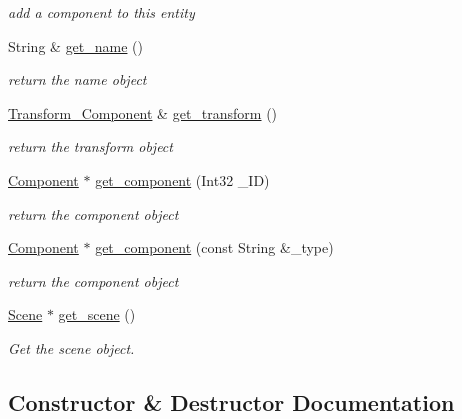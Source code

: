 \begin{DoxyCompactItemize}
\begin{DoxyCompactList}\small\item\em add a component to this entity \end{DoxyCompactList}\item 
String \& \mbox{\hyperlink{classbanita_1_1_entity_aa270c75c0dead62a45a39e4b2b016988}{get\+\_\+name}} ()
\begin{DoxyCompactList}\small\item\em return the name object \end{DoxyCompactList}\item 
\mbox{\hyperlink{classbanita_1_1_transform___component}{Transform\+\_\+\+Component}} \& \mbox{\hyperlink{classbanita_1_1_entity_af19f6e2e27d0f519032da54ef7dec759}{get\+\_\+transform}} ()
\begin{DoxyCompactList}\small\item\em return the transform object \end{DoxyCompactList}\item 
\mbox{\hyperlink{classbanita_1_1_component}{Component}} $\ast$ \mbox{\hyperlink{classbanita_1_1_entity_a6e24a4ca55bf664035d39ab229f849c1}{get\+\_\+component}} (Int32 \+\_\+\+ID)
\begin{DoxyCompactList}\small\item\em return the component object \end{DoxyCompactList}\item 
\mbox{\hyperlink{classbanita_1_1_component}{Component}} $\ast$ \mbox{\hyperlink{classbanita_1_1_entity_aa8fbd735440d40b2a934828aa5e726d6}{get\+\_\+component}} (const String \&\+\_\+type)
\begin{DoxyCompactList}\small\item\em return the component object \end{DoxyCompactList}\item 
\mbox{\hyperlink{classbanita_1_1_scene}{Scene}} $\ast$ \mbox{\hyperlink{classbanita_1_1_entity_abc8ae6f7a0de629ae3a35d904c4338de}{get\+\_\+scene}} ()
\begin{DoxyCompactList}\small\item\em Get the scene object. \end{DoxyCompactList}\end{DoxyCompactItemize}


\subsection{Constructor \& Destructor Documentation}
\mbox{\label{classbanita_1_1_entity_aea5e59bc61fed11d1c23cd6108613b37}} 
